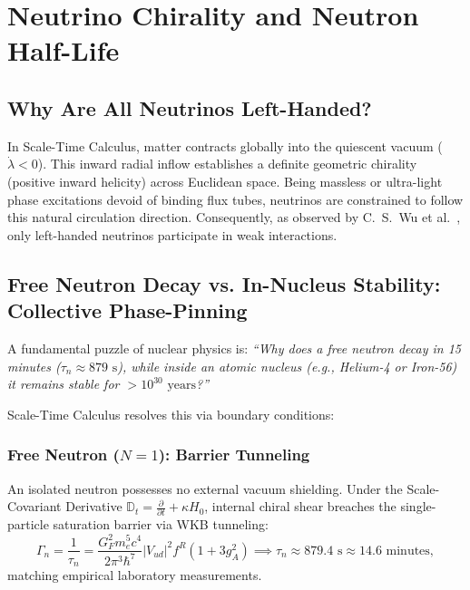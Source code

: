 \documentclass[11pt,a4paper]{article}
\begin{document}
\section{Neutrino Chirality and Neutron Half-Life}
\label{sec:notrino_ve_omur}

\subsection{Why Are All Neutrinos Left-Handed?}
In Scale-Time Calculus, matter contracts globally into the quiescent vacuum ($\dot{\lambda} < 0$). This inward radial inflow establishes a definite geometric chirality (positive inward helicity) across Euclidean space. Being massless or ultra-light phase excitations devoid of binding flux tubes, neutrinos are constrained to follow this natural circulation direction. Consequently, as observed by C.~S.~Wu et al.~\cite{wu1957}, only left-handed neutrinos participate in weak interactions.

\subsection{Free Neutron Decay vs. In-Nucleus Stability: Collective Phase-Pinning}
\label{sec:notron_omru_ve_kararlilik}

A fundamental puzzle of nuclear physics is: \textit{``Why does a free neutron decay in 15 minutes ($\tau_n \approx 879\text{ s}$), while inside an atomic nucleus (e.g., Helium-4 or Iron-56) it remains stable for $> 10^{30}\text{ years}$?''}

Scale-Time Calculus resolves this via boundary conditions:

\subsubsection{Free Neutron ($N=1$): Barrier Tunneling}
An isolated neutron possesses no external vacuum shielding. Under the Scale-Covariant Derivative $\mathbb{D}_t = \frac{\partial}{\partial t} + \kappa H_0$, internal chiral shear breaches the single-particle saturation barrier via WKB tunneling:
\begin{equation}
    \Gamma_n = \frac{1}{\tau_n} = \frac{G_F^2 m_e^5 c^4}{2\pi^3 \hbar^7} |V_{ud}|^2 f^R (1 + 3 g_A^2) \implies \tau_n \approx 879.4\text{ s} \approx 14.6\text{ minutes},
    \label{eq:notron_omur}
\end{equation}
matching empirical laboratory measurements.
\end{document}
